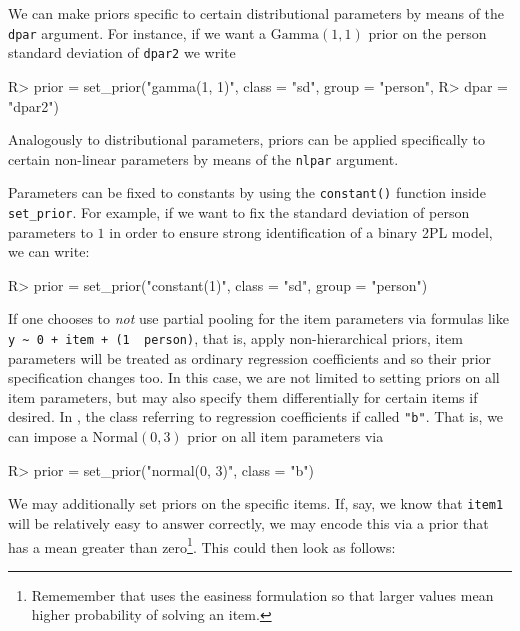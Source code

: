 \documentclass[
]{jss}
\begin{document}
We can make priors specific to certain distributional parameters by
means of the \texttt{dpar} argument. For instance, if we want a
\(\text{Gamma}(1, 1)\) prior on the person standard deviation of
\texttt{dpar2} we write

\begin{CodeChunk}

\begin{CodeInput}
R> prior = set_prior("gamma(1, 1)", class = "sd", group = "person", 
R>                   dpar = "dpar2")
\end{CodeInput}
\end{CodeChunk}

Analogously to distributional parameters, priors can be applied
specifically to certain non-linear parameters by means of the
\texttt{nlpar} argument.

Parameters can be fixed to constants by using the \texttt{constant()}
function inside \texttt{set\_prior}. For example, if we want to fix the
standard deviation of person parameters to \(1\) in order to ensure
strong identification of a binary 2PL model, we can write:

\begin{CodeChunk}

\begin{CodeInput}
R> prior = set_prior("constant(1)", class = "sd", group = "person")
\end{CodeInput}
\end{CodeChunk}

If one chooses to \emph{not} use partial pooling for the item parameters
via formulas like
\texttt{y\ \textasciitilde{}\ 0\ +\ item\ +\ (1\ \textbar{}\ person)},
that is, apply non-hierarchical priors, item parameters will be treated
as ordinary regression coefficients and so their prior specification
changes too. In this case, we are not limited to setting priors on all
item parameters, but may also specify them differentially for certain
items if desired. In , the class referring to regression
coefficients if called \texttt{"b"}. That is, we can impose a
\(\text{Normal}(0, 3)\) prior on all item parameters via

\begin{CodeChunk}

\begin{CodeInput}
R> prior = set_prior("normal(0, 3)", class = "b")
\end{CodeInput}
\end{CodeChunk}

We may additionally set priors on the specific items. If, say, we know
that \texttt{item1} will be relatively easy to answer correctly, we may
encode this via a prior that has a mean greater than
zero\footnote{Rememember that  uses
the easiness formulation so that larger values mean higher probability of
solving an item.}. This could then look as follows:
\end{document}
